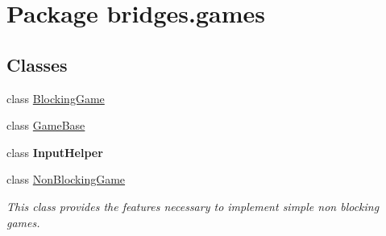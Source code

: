 \hypertarget{namespacebridges_1_1games}{}\section{Package bridges.\+games}
\label{namespacebridges_1_1games}
\subsection*{Classes}
\begin{DoxyCompactItemize}
\item 
class \mbox{\hyperlink{classbridges_1_1games_1_1_blocking_game}{Blocking\+Game}}
\item 
class \mbox{\hyperlink{classbridges_1_1games_1_1_game_base}{Game\+Base}}
\item 
class {\bfseries Input\+Helper}
\item 
class \mbox{\hyperlink{classbridges_1_1games_1_1_non_blocking_game}{Non\+Blocking\+Game}}
\begin{DoxyCompactList}\small\item\em This class provides the features necessary to implement simple non blocking games. \end{DoxyCompactList}\end{DoxyCompactItemize}
